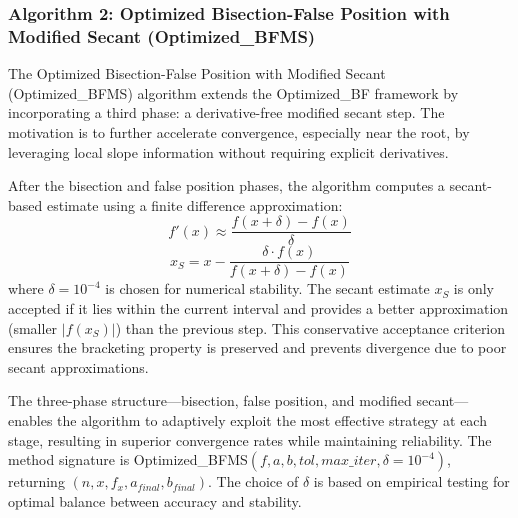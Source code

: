 \documentclass[amsmath, amssymb, aps]{revtex4-2}
\begin{document}

\subsubsection{Algorithm 2: Optimized Bisection-False Position with Modified Secant (Optimized\_BFMS)}

The Optimized Bisection-False Position with Modified Secant (Optimized\_BFMS) algorithm extends the Optimized\_BF framework by incorporating a third phase: a derivative-free modified secant step. The motivation is to further accelerate convergence, especially near the root, by leveraging local slope information without requiring explicit derivatives.

After the bisection and false position phases, the algorithm computes a secant-based estimate using a finite difference approximation:
\begin{equation}
f'(x) \approx \frac{f(x + \delta) - f(x)}{\delta}
\end{equation}
\begin{equation}
x_S = x - \frac{\delta \cdot f(x)}{f(x + \delta) - f(x)}
\end{equation}
where $\delta = 10^{-4}$ is chosen for numerical stability. The secant estimate $x_S$ is only accepted if it lies within the current interval and provides a better approximation (smaller $|f(x_S)|$) than the previous step. This conservative acceptance criterion ensures the bracketing property is preserved and prevents divergence due to poor secant approximations.

The three-phase structure—bisection, false position, and modified secant—enables the algorithm to adaptively exploit the most effective strategy at each stage, resulting in superior convergence rates while maintaining reliability. The method signature is Optimized\_BFMS$(f, a, b, tol, max\_iter, \delta = 10^{-4})$, returning $(n, x, f_x, a_{final}, b_{final})$. The choice of $\delta$ is based on empirical testing for optimal balance between accuracy and stability.
\end{document}

